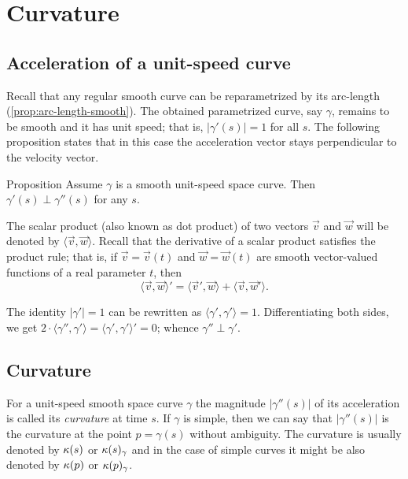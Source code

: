 \chapter{Curvature}
\label{chap:curve-curvature}

\section{Acceleration of a unit-speed curve}

Recall that any regular smooth curve can be reparametrized by its arc-length (\ref{prop:arc-length-smooth}).
The obtained parametrized curve, say $\gamma$, remains to be smooth and it has unit speed; 
that is, $|\gamma'(s)|=1$ for all $s$.
The following proposition states that in this case
the acceleration vector stays perpendicular to the velocity vector.

\begin{thm}{Proposition}\label{prop:a'-pertp-a''}
Assume $\gamma$ is a smooth unit-speed space curve.
Then $\gamma'(s)\perp \gamma''(s)$ for any $s$.
\end{thm}

The scalar product (also known as dot product) of two vectors $\vec v$ and $\vec w$ will be denoted by $\langle \vec v,\vec w\rangle$.
Recall that the derivative of a scalar product satisfies the product rule;
that is, if $\vec v=\vec v(t)$ and $\vec w=\vec w(t)$ are smooth vector-valued functions of a real parameter $t$, then
\[\langle \vec v,\vec w\rangle'=\langle \vec v',\vec w\rangle+\langle \vec v,\vec w'\rangle.\]

The identity $|\gamma'|=1$ can be rewritten as $\langle\gamma',\gamma'\rangle=1$.
Differentiating both sides, we get
$2\cdot\langle\gamma'',\gamma'\rangle=\langle\gamma',\gamma'\rangle'=0$;
whence $\gamma''\perp\gamma'$.
\qeds

\section{Curvature}\label{sec:curvature}

For a unit-speed smooth space curve $\gamma$ the magnitude $|\gamma''(s)|$ of its acceleration is called its \emph{curvature} at  time $s$.
If $\gamma$ is simple, then we can say that $|\gamma''(s)|$ is the curvature at the point $p=\gamma(s)$ without ambiguity.
The curvature is usually denoted by $\kappa(s)$ or $\kappa(s)_\gamma$ and in the case of simple curves it might be also denoted by $\kappa(p)$ or $\kappa(p)_\gamma$.

